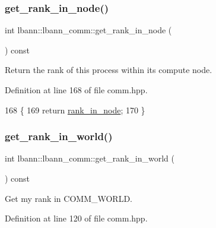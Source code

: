 \subsubsection{\texorpdfstring{get\+\_\+rank\+\_\+in\+\_\+node()}{get\_rank\_in\_node()}}
{\footnotesize\ttfamily int lbann\+::lbann\+\_\+comm\+::get\+\_\+rank\+\_\+in\+\_\+node (\begin{DoxyParamCaption}{ }\end{DoxyParamCaption}) const\hspace{0.3cm}{\ttfamily [inline]}}

Return the rank of this process within its compute node. 

Definition at line 168 of file comm.\+hpp.


\begin{DoxyCode}
168                                       \{
169     \textcolor{keywordflow}{return} \hyperlink{classlbann_1_1lbann__comm_abb5c8b008b5cac11702bf1f991c78ab0}{rank\_in\_node};
170   \}
\end{DoxyCode}
\mbox{\label{classlbann_1_1lbann__comm_a4519335d6772dab3c36517618260d48a}} 
\subsubsection{\texorpdfstring{get\+\_\+rank\+\_\+in\+\_\+world()}{get\_rank\_in\_world()}}
{\footnotesize\ttfamily int lbann\+::lbann\+\_\+comm\+::get\+\_\+rank\+\_\+in\+\_\+world (\begin{DoxyParamCaption}{ }\end{DoxyParamCaption}) const\hspace{0.3cm}{\ttfamily [inline]}}

Get my rank in C\+O\+M\+M\+\_\+\+W\+O\+R\+LD. 

Definition at line 120 of file comm.\+hpp.


